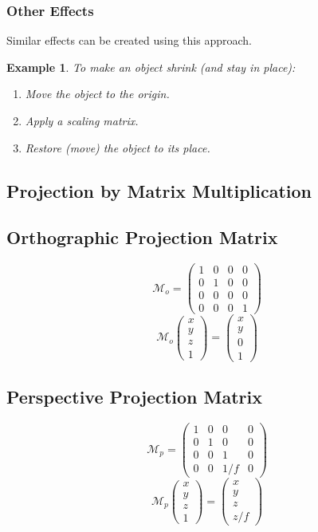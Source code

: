 \documentclass[11pt]{article}
\newtheorem{eg}{Example}
\begin{document}
\subsubsection{Other Effects}
Similar effects can be created using this approach.
\begin{eg}
  To make an object shrink (and stay in place):
  \begin{enumerate}
    \item Move the object to the origin.
    \item Apply a scaling matrix.
    \item Restore (move) the object to its place.
  \end{enumerate}
\end{eg}

\subsection{Projection by Matrix Multiplication}
\subsection{Orthographic Projection Matrix}
\[
  \mathcal{M}_o =
  \begin{pmatrix}
    1 & 0 & 0 & 0 \\
    0 & 1 & 0 & 0 \\
    0 & 0 & 0 & 0 \\
    0 & 0 & 0 & 1
  \end{pmatrix}
\]
\[
  \mathcal{M}_o
  \begin{pmatrix}
    x \\ y \\ z \\ 1
  \end{pmatrix}
  =
  \begin{pmatrix}
    x \\ y \\ 0 \\ 1
  \end{pmatrix}
\]

\subsection{Perspective Projection Matrix}
\[
  \mathcal{M}_p =
  \begin{pmatrix}
    1 & 0 & 0 & 0 \\
    0 & 1 & 0 & 0 \\
    0 & 0 & 1 & 0 \\
    0 & 0 & 1 / f & 0
  \end{pmatrix}
\]
\[
  \mathcal{M}_p
  \begin{pmatrix}
    x \\ y \\ z \\ 1
  \end{pmatrix}
  =
  \begin{pmatrix}
    x \\ y \\ z \\ z / f
  \end{pmatrix}
\]
\end{document}
